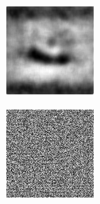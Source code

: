 \begin{figure}[H]
\begin{subfigure}[t]{0.13\textwidth}
  \end{subfigure}
  \begin{subfigure}[t]{0.13\textwidth}
    \centering
    \includegraphics[width=\linewidth]{img/one-trial/intermediate-cnnv3/prediction_2.png}
  \end{subfigure}
  \begin{subfigure}[t]{0.13\textwidth}
    \centering
    \includegraphics[width=\linewidth]{img/one-trial/intermediate-cnnv4/intermediate_2.png}

\end{subfigure}
\end{figure}
